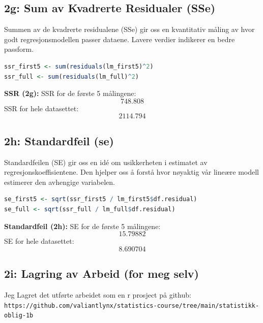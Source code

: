 \documentclass{article}
\begin{document}
\subsection{2g: Sum av Kvadrerte Residualer (SSe)}
Summen av de kvadrerte residualene (SSe) gir oss en kvantitativ måling av hvor godt regresjonsmodellen passer dataene. Lavere verdier indikerer en bedre passform.

\begin{lstlisting}[language=R]
ssr_first5 <- sum(residuals(lm_first5)^2)
ssr_full <- sum(residuals(lm_full)^2)
\end{lstlisting}
\textbf{SSR (2g):} SSR for de første 5 målingene: \[ 748.808  \]
SSR for hele datasettet: \[ 2114.794 \]

\subsection{2h: Standardfeil (se)}
Standardfeilen (SE) gir oss en idé om usikkerheten i estimatet av regresjonskoeffisientene. Den hjelper oss å forstå hvor nøyaktig vår lineære modell estimerer den avhengige variabelen.

\begin{lstlisting}[language=R]
se_first5 <- sqrt(ssr_first5 / lm_first5$df.residual)
se_full <- sqrt(ssr_full / lm_full$df.residual)
\end{lstlisting}
\textbf{Standardfeil (2h):} SE for de første 5 målingene: \[ 15.79882 \]
SE for hele datasettet: \[ 8.690704 \]

\subsection{2i: Lagring av Arbeid (for meg selv)}
Jeg Lagret det utførte arbeidet som en r prosject på github: \\ 
\texttt{https://github.com/valiantlynx/statistics-course/tree/main/statistikk-oblig-1b}
\end{document}
